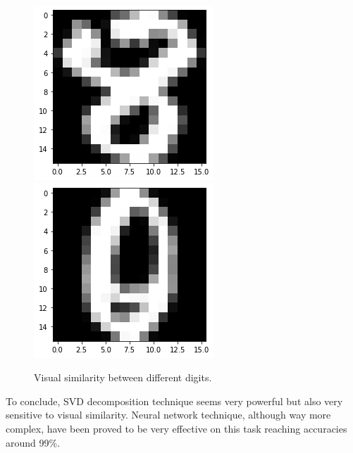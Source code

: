 \documentclass[a4paper,10pt]{report}
\begin{document}
\begin{figure}[!htb]
  \includegraphics[width=\linewidth]{8.png}
  \endminipage\hfill
  \includegraphics[width=\linewidth]{0_2.png}
  \endminipage\hfill
  \caption{Visual similarity between different digits.}
  \label{fig:digits}
\end{figure}
To conclude, SVD decomposition technique seems very powerful but also very sensitive to visual similarity. Neural network technique, although way more complex, have been proved to be very effective on this task reaching accuracies around 99\%.
\end{document}
